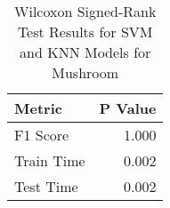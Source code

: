 \begin{table}
\centering
\caption{Wilcoxon Signed-Rank Test Results for SVM and KNN Models for Mushroom}
\label{tab:svm_knn_wilcoxon_comparison_mushroom}
\begin{tabular}{lr}
\toprule
Metric & P Value \\
\midrule
F1 Score & 1.000 \\
Train Time & 0.002 \\
Test Time & 0.002 \\
\bottomrule
\end{tabular}
\end{table}
